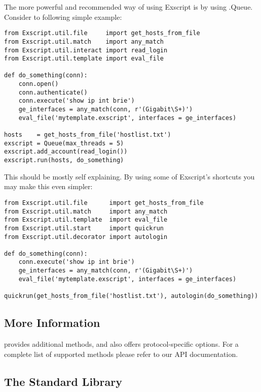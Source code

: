 The more powerful and recommended way of using Exscript is by using 
\product.Queue.
Consider to following simple example:

\begin{lstlisting}
from Exscript.util.file     import get_hosts_from_file
from Exscript.util.match    import any_match
from Exscript.util.interact import read_login
from Exscript.util.template import eval_file

def do_something(conn):
    conn.open()
    conn.authenticate()
    conn.execute('show ip int brie')
    ge_interfaces = any_match(conn, r'(Gigabit\S+)')
    eval_file('mytemplate.exscript', interfaces = ge_interfaces)

hosts    = get_hosts_from_file('hostlist.txt')
exscript = Queue(max_threads = 5)
exscript.add_account(read_login())
exscript.run(hosts, do_something) 
\end{lstlisting}

This should be mostly self explaining. By using some of Exscript's 
shortcuts you may make this even simpler:

\begin{lstlisting}
from Exscript.util.file      import get_hosts_from_file
from Exscript.util.match     import any_match
from Exscript.util.template  import eval_file
from Exscript.util.start     import quickrun
from Exscript.util.decorator import autologin

def do_something(conn):
    conn.execute('show ip int brie')
    ge_interfaces = any_match(conn, r'(Gigabit\S+)')
    eval_file('mytemplate.exscript', interfaces = ge_interfaces)

quickrun(get_hosts_from_file('hostlist.txt'), autologin(do_something)) 
\end{lstlisting}

\subsection{More Information}

\product provides additional methods, and also offers protocol-specific 
options. For a complete list of supported methods please refer to our API 
documentation.


\begin{appendix}
\section{The Standard Library}
\label{stdlib}

\end{appendix}


